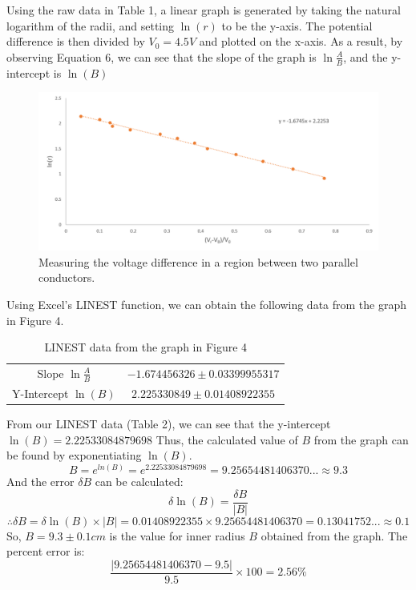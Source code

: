\documentclass[letterpaper]{article}
\begin{document}
Using the raw data in Table 1, a linear graph is generated by taking the natural logarithm of the
radii, and setting $\ln{(r)}$ to be the y-axis. The potential difference is then divided by $V_0=4.5 V$
and plotted on the x-axis. As a result, by observing Equation 6, we can see that the
slope of the graph is $\ln{\frac{A}{B}}$, and the y-intercept is $\ln{(B)}$
\begin{figure}[H]
  \centering
  \includegraphics[width=\textwidth]{chart1.png}
  \caption{Measuring the voltage difference in a region between two parallel conductors.}
\end{figure}
\newpage
Using Excel's LINEST function, we can obtain the following data from the graph in Figure 4.
\begin{table}[H]
\centering
\begin{tabular}{cc}
  Slope  $\ln{\frac{A}{B}}$ &  $-1.674456326\pm0.03399955317$ \\
  Y-Intercept $\ln{(B)}$   &  $2.225330849\pm0.01408922355$ \\
\end{tabular}
\caption{LINEST data from the graph in Figure 4}
\end{table}


From our LINEST data (Table 2), we can see that the y-intercept $\ln{(B)}=2.22533084879698$
Thus, the calculated value of $B$ from the graph can be found by exponentiating $\ln{(B)}$.\\
  $$B= e^{ln(B)} = e^{2.22533084879698}=9.25654481406370...\approx 9.3$$
And the error $\delta B$ can be calculated:
$$ \delta \ln{(B)} = \frac{\delta B}{|B|}$$
$$ \therefore \delta B = \delta \ln{(B)} \times |B| = 0.01408922355 \times 9.25654481406370 = 0.13041752...\approx 0.1  $$
So, $B=9.3\pm 0.1 cm$ is the value for inner radius $B$ obtained from the graph.
The percent error is:
$$ \frac{|9.25654481406370-9.5|}{9.5}\times100 = 2.56\%$$
\end{document}
